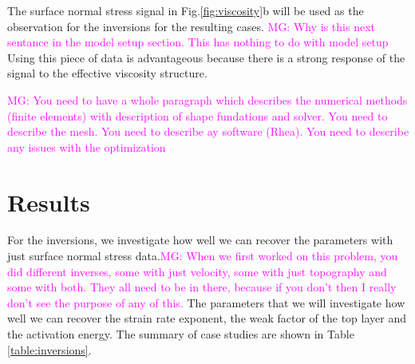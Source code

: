 \documentclass[12pt]{article}
\newcommand{\mgnote}[1]{\textcolor{magenta}{MG: #1}}
\begin{document}
The surface normal stress signal in Fig.\ref{fig:viscosity}b will be used as the observation for the inversions for the resulting cases. \mgnote{Why is this next sentance in the model setup section. This has nothing to do with model setup} Using this piece of data is advantageous because there is a strong response of the signal to the effective viscosity structure. 

\mgnote{You need to have a whole paragraph which describes the numerical methods (finite elements) with description of shape fundations and solver. You need to describe the mesh. You need to describe ay software (Rhea). You need to describe any issues with the optimization}

\section*{Results}
For the inversions, we investigate how well we can recover the parameters with just surface normal stress data.\mgnote{When we first worked on this problem, you did different inverses, some with just velocity, some with just topography and some with both. They all need to be in there, because if you don't then I really don't see the purpose of any of this.} The parameters that we will investigate how well we can recover the strain rate exponent, the weak factor of the top layer and the activation energy.  The summary of case studies are shown in Table \ref{table:inversions}. %
\end{document}
